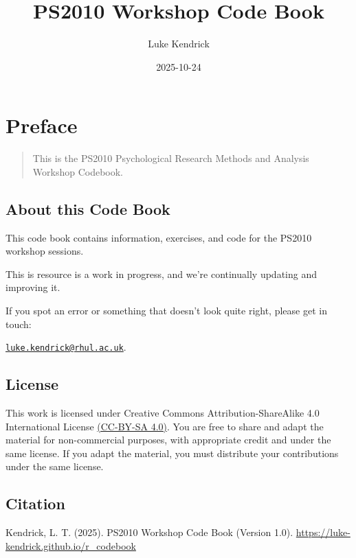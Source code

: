 \documentclass[
]{book}
\title{PS2010 Workshop Code Book}
\author{Luke Kendrick}
\date{2025-10-24}
\let\oldsection\section
\renewcommand{\section}{\needspace{5\baselineskip}\oldsection}
\begin{document}
\maketitle

{
\setcounter{tocdepth}{1}
\tableofcontents
}
\chapter*{Preface}\label{preface}

\begin{quote}
This is the PS2010 Psychological Research Methods and Analysis Workshop Codebook.
\end{quote}

\section{About this Code Book}\label{about-this-code-book}

This code book contains information, exercises, and code for the PS2010 workshop sessions.

This is resource is a work in progress, and we're continually updating and improving it.

If you spot an error or something that doesn't look quite right, please get in touch:

\href{mailto:luke.kendrick@rhul.ac.uk}{\nolinkurl{luke.kendrick@rhul.ac.uk}}.

\section{\texorpdfstring{\textbf{License}}{License}}\label{license}

This work is licensed under Creative Commons Attribution-ShareAlike 4.0 International License \href{https://creativecommons.org/licenses/by-sa/4.0/}{(CC-BY-SA 4.0)}. You are free to share and adapt the material for non-commercial purposes, with appropriate credit and under the same license. If you adapt the material, you must distribute your contributions under the same license.

\section{\texorpdfstring{\textbf{Citation}}{Citation}}\label{citation}

Kendrick, L. T. (2025). PS2010 Workshop Code Book (Version 1.0). \url{https://luke-kendrick.github.io/r_codebook}
\end{document}
